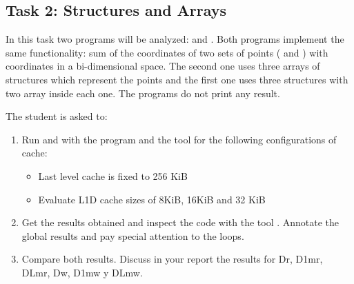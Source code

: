 \clearpage
\subsection{Task 2: Structures and Arrays}

In this task two programs will be analyzed:  and
. 
Both programs implement the same functionality: sum of the
coordinates of two sets of points ( and ) with coordinates in
a bi-dimensional space.  The second one uses three arrays of structures which
represent the points and the first one uses three structures with two array
inside each one. 
The programs do not print any result.




The student is asked to: 

\begin{enumerate}

\item Run  and  with the program
 and the tool  for the following configurations of cache:

\begin{itemize}
\item Last level cache is fixed to 256 KiB
\item Evaluate L1D cache sizes of 8KiB, 16KiB and 32 KiB
\end{itemize}

\item Get the results obtained and inspect the code with the tool
. Annotate the global results and pay special
attention to the loops.

\item Compare both results.
 Discuss in your report the results for Dr, D1mr, DLmr, Dw,
D1mw y DLmw.

\end{enumerate}

